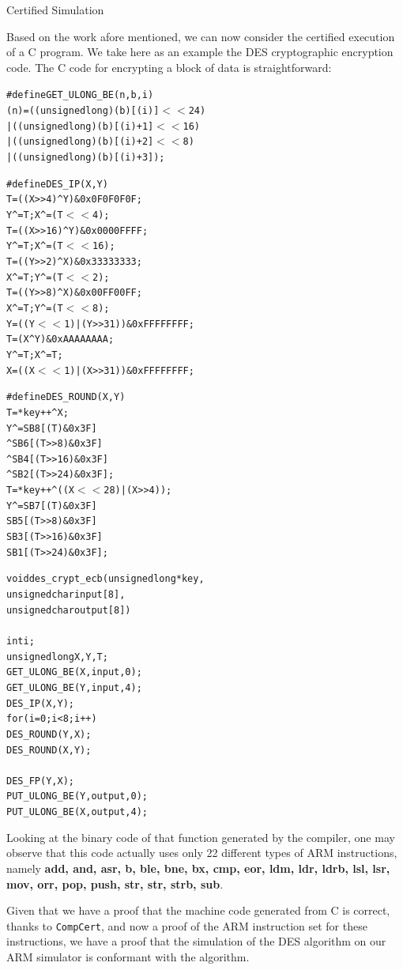 \documentclass[twocolumn]{article}
\makeatletter
\def\section{\@startsection {section}{1}{\z@}{20pt plus 2pt minus 2pt}
{8pt plus 2pt minus 2pt}{\centering\normalsize\sc
\edef\@svsec{\thesection.\ }}}
\def\thesection{\Roman{section}}
\newcommand{\compcert}{\texttt{CompCert}\xspace}
\makeatother
\begin{document}
\section{Certified Simulation}

Based on the work afore mentioned, we can now consider the certified
execution of a C program. We take here as an example the DES
cryptographic encryption code.  The C code for encrypting a block of
data is straightforward:
\begin{alltt}
#define GET_ULONG_BE(n,b,i)
 (n) = ( (unsigned long) (b)[(i)] $<<$ 24 )
    | ( (unsigned long) (b)[(i) + 1] $<<$ 16)
    | ( (unsigned long) (b)[(i) + 2] $<<$  8)
    | ( (unsigned long) (b)[(i) + 3]      );

#define DES_IP(X,Y)
    T = ((X >>  4) ^ Y) \& 0x0F0F0F0F;
    Y ^= T; X ^= (T $<<$  4);
    T = ((X >> 16) ^ Y) \& 0x0000FFFF;
    Y ^= T; X ^= (T $<<$ 16);
    T = ((Y >>  2) ^ X) \& 0x33333333;
    X ^= T; Y ^= (T $<<$  2);
    T = ((Y >>  8) ^ X) \& 0x00FF00FF;
    X ^= T; Y ^= (T $<<$  8);
    Y = ((Y $<<$ 1) | (Y >> 31)) \& 0xFFFFFFFF;
    T = (X ^ Y) \& 0xAAAAAAAA;
    Y ^= T; X ^= T;
    X = ((X $<<$ 1) | (X >> 31)) \& 0xFFFFFFFF;

#define DES_ROUND(X,Y)
    T = *key++ ^ X;
    Y ^= SB8[ (T      ) \& 0x3F ]
       ^  SB6[ (T >>  8) \& 0x3F ]
       ^  SB4[ (T >> 16) \& 0x3F ]
       ^  SB2[ (T >> 24) \& 0x3F ];
    T = *key++ ^ ((X $<<$ 28) | (X >> 4));
    Y ^= SB7[ (T      ) \& 0x3F ]
         SB5[ (T >>  8) \& 0x3F ]
         SB3[ (T >> 16) \& 0x3F ]
         SB1[ (T >> 24) & 0x3F ];

void des_crypt_ecb( unsigned long *key,
                    unsigned char input[8],
                    unsigned char output[8] )
{
    int i;
    unsigned long X, Y, T;
    GET_ULONG_BE( X, input, 0 );
    GET_ULONG_BE( Y, input, 4 );
    DES_IP( X, Y );
    for( i = 0; i < 8; i++ )  {
        DES_ROUND( Y, X );
        DES_ROUND( X, Y );
    }
    DES_FP( Y, X );
    PUT_ULONG_BE( Y, output, 0 );
    PUT_ULONG_BE( X, output, 4 );
}
\end{alltt}

Looking at the binary code of that function generated by the compiler,
one may observe that this code actually uses only 22 different types of ARM
instructions, namely \textbf{ add, and, asr, b, ble, bne, bx, cmp,
  eor, ldm, ldr, ldrb, lsl, lsr, mov, orr, pop, push, str, str, strb,
  sub}.

Given that we have a proof that the machine code generated from C is
correct, thanks to \compcert, and now a proof of the ARM instruction
set for these instructions, we have a proof that the simulation of the
DES algorithm on our ARM simulator is conformant with the algorithm.
\end{document}
